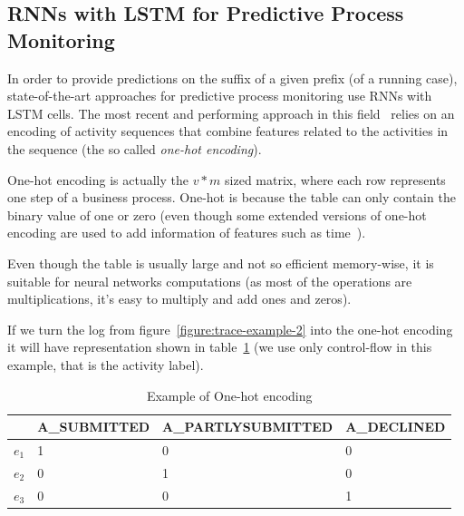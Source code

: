 \subsection{RNNs with LSTM for Predictive Process Monitoring}
\label{subsec:RNNforpredictive}
In order to provide predictions on the suffix of a given prefix (of a running case), state-of-the-art approaches for predictive process monitoring use RNNs with LSTM cells.  The most recent and performing approach in this field~\cite{niek96732} relies on an encoding of activity sequences that combine features related to the activities in the sequence (the so called \textit{one-hot encoding}).

One-hot encoding is actually the $v*m$ sized matrix, where each row represents one step of a business process. One-hot is because the table can only contain the binary value of one or zero (even though some extended versions of one-hot encoding are used to add information of features such as time~\cite{niek96732}). 

Even though the table is usually large and not so efficient memory-wise, it is suitable for neural networks computations (as most of the operations are multiplications, it's easy to multiply and add ones and zeros). 

If we turn the log from figure~\ref{figure:trace-example-2} into the one-hot encoding it will have representation shown in table~\ref{tab:one-hot} (we use only control-flow in this example, that is the activity label).

\begin{table}[h]
	\centering
	\begin{tabular}{| l | l | l | l |}
		\hline
		& A\_SUBMITTED & A\_PARTLYSUBMITTED & A\_DECLINED \\	
		\hline
		$e_{1}$ & 1 & 0 & 0 \\
		$e_{2}$ & 0 & 1 & 0 \\
		$e_{3}$ & 0 & 0 & 1 \\
		\hline
	\end{tabular}
	\caption{Example of One-hot encoding}
	\label{tab:one-hot}
\end{table}

